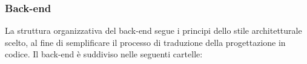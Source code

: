 \subsubsection{Back-end}

\par La struttura organizzativa del back-end segue i principi dello stile architetturale scelto, al fine di semplificare il processo di traduzione della progettazione in codice. Il back-end è suddiviso nelle seguenti cartelle:

\begin{minipage}{\textwidth}
\end{minipage}